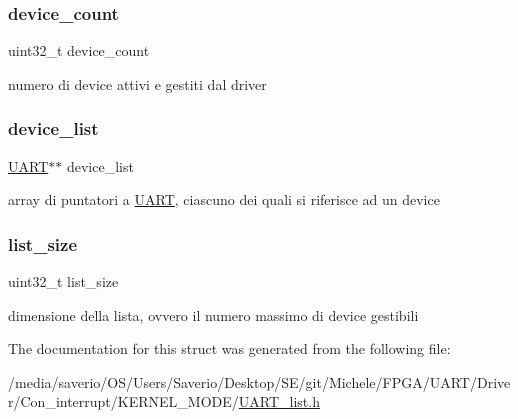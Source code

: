 \subsubsection{\texorpdfstring{device\+\_\+count}{device\_count}}
{\footnotesize\ttfamily uint32\+\_\+t device\+\_\+count}

numero di device attivi e gestiti dal driver \mbox{\label{structUART__list_a851af86c80724adf330596f12617066b}} 
\subsubsection{\texorpdfstring{device\+\_\+list}{device\_list}}
{\footnotesize\ttfamily \hyperlink{structUART}{U\+A\+RT}$\ast$$\ast$ device\+\_\+list}

array di puntatori a \hyperlink{structUART}{U\+A\+RT}, ciascuno dei quali si riferisce ad un device \mbox{\label{structUART__list_aeff61809685e5df1b38aec1d871a49bb}} 
\subsubsection{\texorpdfstring{list\+\_\+size}{list\_size}}
{\footnotesize\ttfamily uint32\+\_\+t list\+\_\+size}

dimensione della lista, ovvero il numero massimo di device gestibili 

The documentation for this struct was generated from the following file\+:\begin{DoxyCompactItemize}
\item 
/media/saverio/\+O\+S/\+Users/\+Saverio/\+Desktop/\+S\+E/git/\+Michele/\+F\+P\+G\+A/\+U\+A\+R\+T/\+Driver/\+Con\+\_\+interrupt/\+K\+E\+R\+N\+E\+L\+\_\+\+M\+O\+D\+E/\hyperlink{UART__list_8h}{U\+A\+R\+T\+\_\+list.\+h}\end{DoxyCompactItemize}
